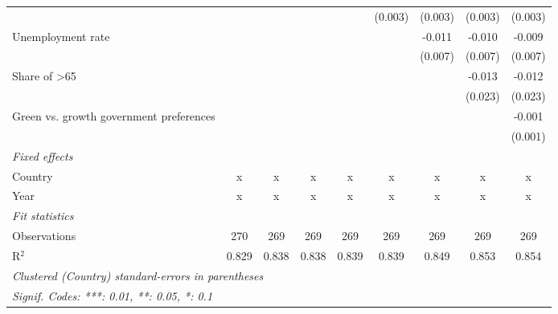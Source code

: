 \begin{table}[htbp]
\begin{tabular}{lcccccccc}
                                                                              &         &         &         &         & (0.003) & (0.003) & (0.003)      & (0.003)\\   
      Unemployment rate                                                       &         &         &         &         &         & -0.011  & -0.010       & -0.009\\   
                                                                              &         &         &         &         &         & (0.007) & (0.007)      & (0.007)\\   
      Share of >65                                                            &         &         &         &         &         &         & -0.013       & -0.012\\   
                                                                              &         &         &         &         &         &         & (0.023)      & (0.023)\\   
      Green vs. growth government preferences                                 &         &         &         &         &         &         &              & -0.001\\   
                                                                              &         &         &         &         &         &         &              & (0.001)\\   
      \emph{Fixed effects}\\
      Country                                                                 & x       & x       & x       & x       & x       & x       & x            & x\\  
      Year                                                                    & x       & x       & x       & x       & x       & x       & x            & x\\  
      \midrule \emph{Fit statistics}\\
      Observations                                                            & 270     & 269     & 269     & 269     & 269     & 269     & 269          & 269\\  
      R$^2$                                                                   & 0.829   & 0.838   & 0.838   & 0.839   & 0.839   & 0.849   & 0.853        & 0.854\\  
      \midrule
      \multicolumn{9}{l}{\emph{Clustered (Country) standard-errors in parentheses}}\\
      \multicolumn{9}{l}{\emph{Signif. Codes: ***: 0.01, **: 0.05, *: 0.1}}\\
   \end{tabular}
\end{table}


